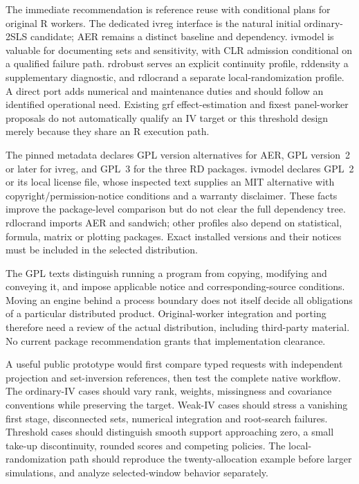 The immediate recommendation is reference reuse with conditional plans for
original R workers. The dedicated ivreg interface is the natural initial
ordinary-2SLS candidate; AER remains a distinct baseline and dependency.
ivmodel is valuable for documenting sets and sensitivity, with CLR admission
conditional on a qualified failure path. rdrobust serves an explicit continuity
profile, rddensity a supplementary diagnostic, and rdlocrand a separate
local-randomization profile. A direct port adds numerical and maintenance duties
and should follow an identified operational need. Existing grf effect-estimation
and fixest panel-worker proposals do not automatically qualify an IV target or
this threshold design merely because they share an R execution path.

The pinned metadata declares GPL version alternatives for AER, GPL version~2 or
later for ivreg, and GPL~3 for the three RD packages. ivmodel declares GPL~2 or
its local license file, whose inspected text supplies an MIT alternative with
copyright/permission-notice conditions and a warranty disclaimer. These facts
improve the package-level comparison but do not clear the full dependency tree.
rdlocrand imports AER and sandwich; other profiles also depend on statistical,
formula, matrix or plotting packages. Exact installed versions and their notices
must be included in the selected distribution.~\citep{exec22_riv_aer,
exec22_riv_ivreg,exec22_riv_ivmodel,exec22_riv_rdrobust,exec22_riv_rddensity,
exec22_riv_rdlocrand}

The GPL texts distinguish running a program from copying, modifying and conveying
it, and impose applicable notice and corresponding-source conditions. Moving an
engine behind a process boundary does not itself decide all obligations of a
particular distributed product. Original-worker integration and porting therefore
need a review of the actual distribution, including third-party material. No
current package recommendation grants that implementation clearance.
\citep{exec22_riv_gpl2,exec22_riv_gpl3}

A useful public prototype would first compare typed requests with independent
projection and set-inversion references, then test the complete native workflow.
The ordinary-IV cases should vary rank, weights, missingness and covariance
conventions while preserving the target. Weak-IV cases should stress a vanishing
first stage, disconnected sets, numerical integration and root-search failures.
Threshold cases should distinguish smooth support approaching zero, a small
take-up discontinuity, rounded scores and competing policies. The local-randomization
path should reproduce the twenty-allocation example before larger simulations,
and analyze selected-window behavior separately.

